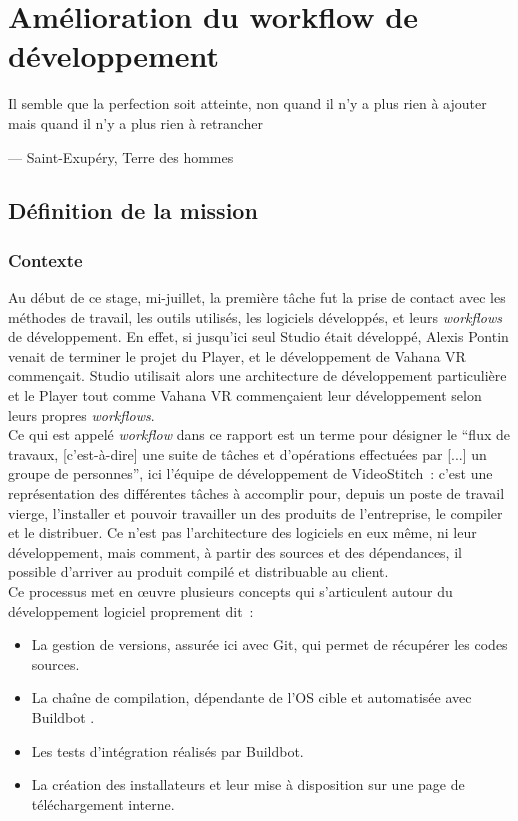 \chapter{Amélioration du workflow de développement}
\epigraph{Il semble que la perfection soit atteinte, non quand il n'y a plus 
rien à ajouter mais quand il n'y a plus rien à retrancher}{--- \small{\textup{Saint-Exupéry,
Terre des hommes}}}

\section{Définition de la mission}
\subsection{Contexte}
Au début de ce stage, mi-juillet, la première tâche fut la prise de contact avec 
les méthodes de travail, les outils utilisés, les logiciels développés, et leurs
\textit{workflows} de développement. En effet, si jusqu'ici seul Studio était développé, Alexis
Pontin venait de terminer le projet du Player, et le développement de Vahana
VR commençait. Studio utilisait alors une architecture de développement particulière
et le Player tout comme Vahana VR commençaient leur développement selon leurs propres
\textit{workflows}.\\
\newline
Ce qui est appelé \textit{workflow} dans ce rapport est un terme pour désigner le 
\enquote{flux de travaux, [c'est-à-dire] une suite de tâches et
d'opérations effectuées par [...] un groupe de personnes}\cite{workflow}, ici l'équipe de développement
de VideoStitch~: c'est une représentation des différentes tâches à accomplir pour, depuis un poste de travail vierge, 
l'installer et pouvoir travailler un des produits de l'entreprise, le compiler et le distribuer.
Ce n'est pas l'architecture des logiciels en eux même, ni leur développement,
mais comment, à partir des sources et des dépendances, il possible d'arriver au produit
compilé et distribuable au client.\\
Ce processus met en \oe uvre plusieurs concepts qui s'articulent autour du développement
logiciel proprement dit~:\cite{software-build}\cite{build-automation}
\begin{itemize}
  \item La gestion de versions, assurée ici avec Git\cite{gestion-versions}, qui permet
  de récupérer les codes sources.
  \item La chaîne de compilation, dépendante de l'OS cible et automatisée avec Buildbot 
  \cite{chaine-compilation}\cite{integration-continue}.
  \item Les tests d'intégration\cite{integration-continue} réalisés par Buildbot.
  \item La création des installateurs et leur mise à disposition sur une page de téléchargement interne.
\end{itemize}
